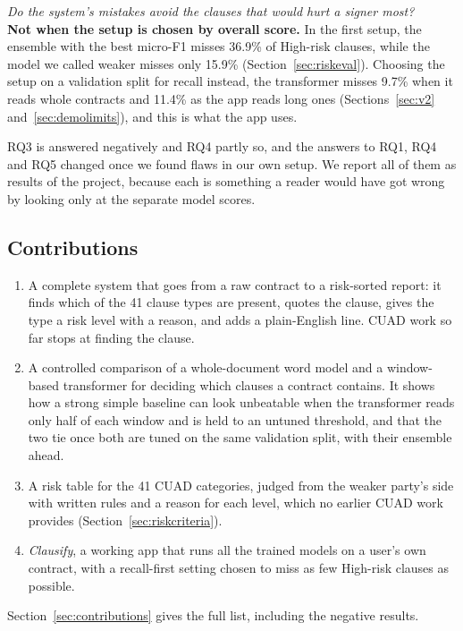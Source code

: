 \begin{description}[itemsep=4pt, leftmargin=1.6cm]
  \item[RQ5] \emph{Do the system's mistakes avoid the clauses that would hurt a signer most?}\\
  \textbf{Not when the setup is chosen by overall score.} In the first setup, the ensemble with the best micro-F1 misses 36.9\% of High-risk clauses, while the model we called weaker misses only 15.9\% (Section~\ref{sec:riskeval}). Choosing the setup on a validation split for recall instead, the transformer misses 9.7\% when it reads whole contracts and 11.4\% as the app reads long ones (Sections~\ref{sec:v2} and~\ref{sec:demolimits}), and this is what the app uses.
\end{description}

RQ3 is answered negatively and RQ4 partly so, and the answers to RQ1, RQ4 and RQ5 changed once we found flaws in our own setup. We report all of them as results of the project, because each is something a reader would have got wrong by looking only at the separate model scores.

\subsection{Contributions}
\label{sec:contrib1}
\begin{enumerate}[itemsep=2pt]
  \item A complete system that goes from a raw contract to a risk-sorted report: it finds which of the 41 clause types are present, quotes the clause, gives the type a risk level with a reason, and adds a plain-English line. CUAD work so far stops at finding the clause.
  \item A controlled comparison of a whole-document word model and a window-based transformer for deciding which clauses a contract contains. It shows how a strong simple baseline can look unbeatable when the transformer reads only half of each window and is held to an untuned threshold, and that the two tie once both are tuned on the same validation split, with their ensemble ahead.
  \item A risk table for the 41 CUAD categories, judged from the weaker party's side with written rules and a reason for each level, which no earlier CUAD work provides (Section~\ref{sec:riskcriteria}).
  \item \emph{Clausify}, a working app that runs all the trained models on a user's own contract, with a recall-first setting chosen to miss as few High-risk clauses as possible.
\end{enumerate}
Section~\ref{sec:contributions} gives the full list, including the negative results.


